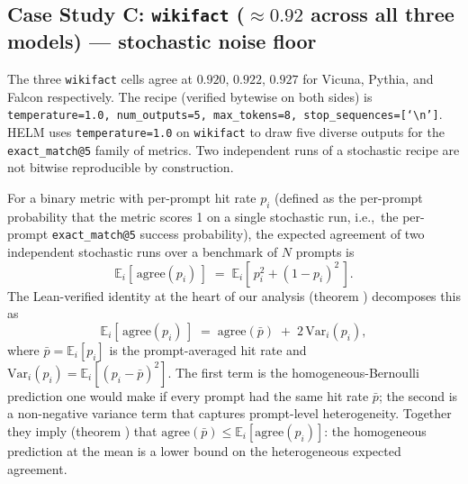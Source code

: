 \subsection{Case Study C: \texorpdfstring{\texttt{wikifact} ($\approx 0.92$ across all three models)}{wikifact (approx 0.92 across all three models)} --- stochastic noise floor}
\label{sec:app-helm-wikifact-v2}

The three \texttt{wikifact} cells agree at $0.920$, $0.922$, $0.927$
  for Vicuna, Pythia, and Falcon respectively.
The recipe (verified bytewise on both sides) is
  \texttt{temperature=1.0, num\_outputs=5, max\_tokens=8,
  stop\_sequences=[`\textbackslash n']}.
HELM uses \texttt{temperature=1.0} on \texttt{wikifact} to draw five
  diverse outputs for the \texttt{exact\_match@5} family of metrics.
Two independent runs of a stochastic recipe are not bitwise
  reproducible by construction.

For a binary metric with per-prompt hit rate $p_i$ (defined as the
  per-prompt probability that the metric scores 1 on a single
  stochastic run, i.e.,~the per-prompt \texttt{exact\_match@5} success
  probability), the expected agreement of two independent stochastic
  runs over a benchmark of $N$ prompts is
\[
  \mathbb{E}_i[\,\text{agree}(p_i)\,]
  \;=\;
  \mathbb{E}_i[\,p_i^2 + (1-p_i)^2\,].
\]
The Lean-verified identity at the heart of our analysis (theorem
  )
  decomposes this as
\[
  \mathbb{E}_i[\,\text{agree}(p_i)\,]
  \;=\;
  \text{agree}(\bar p) \;+\; 2\,\mathrm{Var}_i(p_i),
\]
where $\bar p = \mathbb{E}_i[p_i]$ is the prompt-averaged hit rate and
  $\mathrm{Var}_i(p_i) = \mathbb{E}_i[(p_i - \bar p)^2]$.
The first term is the homogeneous-Bernoulli prediction one would make
  if every prompt had the same hit rate $\bar p$; the second is a
  non-negative variance term that captures prompt-level
  heterogeneity.
Together they imply (theorem
  ) that
  $\text{agree}(\bar p) \le \mathbb{E}_i[\text{agree}(p_i)]$: the
  homogeneous prediction at the mean is a lower bound on the
  heterogeneous expected agreement.

